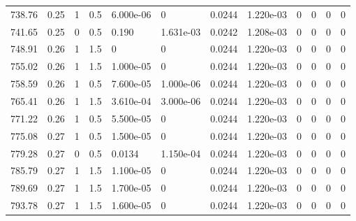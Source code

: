 \documentclass[preview]{standalone}
\begin{document}
{{{{{\begin{tabular}{L{1.2cm}C{1.2cm} C{0.3cm}C{0.5cm} C{1.4cm}C{1.4cm} C{1.4cm}C{1.4cm} C{1.6cm}C{1.6cm} C{1.6cm}C{1.6cm}}
  738.76  &  0.25  & 1     & 0.5 &  6.000e-06  & 0  &  0.0244&   1.220e-03& 0 & 0   &  0 & 0  \\ 
  741.65  &  0.25  & 0     & 0.5 &  0.190  & 1.631e-03  &  0.0242&   1.208e-03& 0 & 0   &  0 & 0  \\ 
  748.91  &  0.26  & 1     & 1.5 &  0  & 0  &  0.0244&   1.220e-03& 0 & 0   &  0 & 0  \\ 
  755.02  &  0.26  & 1     & 1.5 &  1.000e-05  & 0  &  0.0244&   1.220e-03& 0 & 0   &  0 & 0  \\ 
  758.59  &  0.26  & 1     & 0.5 &  7.600e-05  & 1.000e-06  &  0.0244&   1.220e-03& 0 & 0   &  0 & 0  \\ 
  765.41  &  0.26  & 1     & 1.5 &  3.610e-04  & 3.000e-06  &  0.0244&   1.220e-03& 0 & 0   &  0 & 0  \\ 
  771.22  &  0.26  & 1     & 0.5 &  5.500e-05  & 0  &  0.0244&   1.220e-03& 0 & 0   &  0 & 0  \\ 
  775.08  &  0.27  & 1     & 0.5 &  1.500e-05  & 0  &  0.0244&   1.220e-03& 0 & 0   &  0 & 0  \\ 
  779.28  &  0.27  & 0     & 0.5 &  0.0134  & 1.150e-04  &  0.0244&   1.220e-03& 0 & 0   &  0 & 0  \\ 
  785.79  &  0.27  & 1     & 1.5 &  1.100e-05  & 0  &  0.0244&   1.220e-03& 0 & 0   &  0 & 0  \\ 
  789.69  &  0.27  & 1     & 1.5 &  1.700e-05  & 0  &  0.0244&   1.220e-03& 0 & 0   &  0 & 0  \\ 
  793.78  &  0.27  & 1     & 1.5 &  1.600e-05  & 0  &  0.0244&   1.220e-03& 0 & 0   &  0 & 0  \\ 
\hline 
\end{tabular} 

}}}}}
\end{document}
